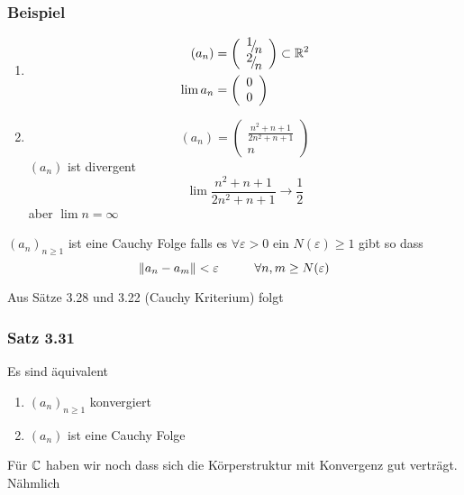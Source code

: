 \subsubsection*{Beispiel}
\begin{enumerate}
\item\begin{align*} \left( {{a_n}} \right)&= \left( {\begin{array}{*{20}{c}}
{{\raise0.7ex\hbox{$1$} \!\mathord{\left/
 {\vphantom {1 n}}\right.\kern-\nulldelimiterspace}
\!\lower0.7ex\hbox{$n$}}}\\
{{\raise0.7ex\hbox{$2$} \!\mathord{\left/
 {\vphantom {2 n}}\right.\kern-\nulldelimiterspace}
\!\lower0.7ex\hbox{$n$}}}
\end{array}} \right) \subset\R^2\\
\lim a_n&=\left( {\begin{array}{*{20}{c}}
0\\
0
\end{array}} \right) \end{align*}
\item \[\left( {{a_n}} \right) = \left( {\begin{array}{*{20}{c}}
{\frac{{{n^2} + n + 1}}{{2{n^2} + n + 1}}}\\
n
\end{array}} \right)\]
$\left( a_n\right)$ ist divergent
\[\lim \frac{{{n^2} + n + 1}}{{2{n^2} + n + 1}} \to \frac{1}{2}\] aber $\lim n=\infty$
\end{enumerate}

\begin{definition}{3.30}
$\left( a_n\right)_{n\geq 1}$ ist eine Cauchy Folge falls es $\forall\varepsilon >0$ ein $N(\varepsilon)\geq 1$ gibt so dass 
\[\left\| {{a_n} - {a_m}} \right\| < \varepsilon \hspace{10mm}\forall n,m \ge N(\varepsilon )\]
\end{definition}
\noindent Aus Sätze 3.28 und 3.22 (Cauchy Kriterium) folgt 
\subsubsection*{Satz 3.31}
Es sind äquivalent 
\begin{enumerate}
\item $\left( a_n\right)_{n\geq 1}$ konvergiert
\item $\left( a_n\right)$ ist eine Cauchy Folge
\end{enumerate}
Für $\mathbb{C}$ haben wir noch dass sich die Körperstruktur mit Konvergenz gut verträgt. Nähmlich
